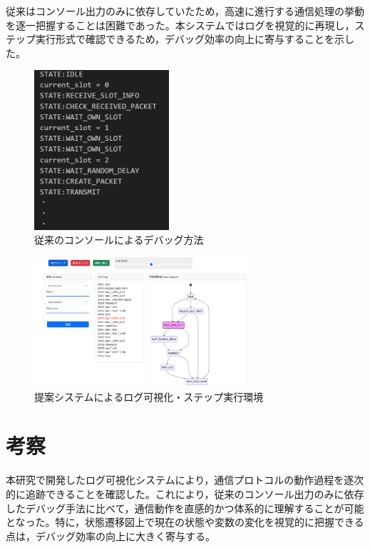 \documentclass[paper]{ieicej}
\begin{document}
従来はコンソール出力のみに依存していたため，高速に進行する通信処理の挙動を逐一把握することは困難であった。本システムではログを視覚的に再現し，ステップ実行形式で確認できるため，デバッグ効率の向上に寄与することを示した。
\begin{figure}[tb]
  \centering
  \includegraphics[width=50mm]{./images/old_debug.png}
  \caption{従来のコンソールによるデバッグ方法}
  \label{fig:old-debug}
\end{figure}
\begin{figure}[tb]
  \centering
  \includegraphics[width=80mm]{./images/step_3.png}
  \caption{提案システムによるログ可視化・ステップ実行環境}
  \label{fig:viewer-ui}
\end{figure}


\section{考察}
本研究で開発したログ可視化システムにより，通信プロトコルの動作過程を逐次的に追跡できることを確認した。これにより，従来のコンソール出力のみに依存したデバッグ手法に比べて，通信動作を直感的かつ体系的に理解することが可能となった。特に，状態遷移図上で現在の状態や変数の変化を視覚的に把握できる点は，デバッグ効率の向上に大きく寄与する。
\end{document}
